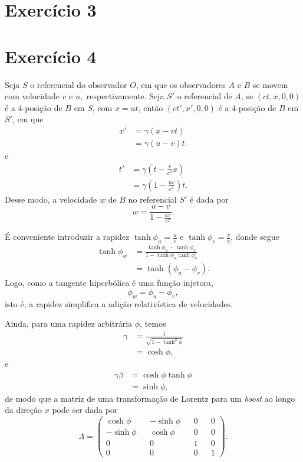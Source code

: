\documentclass[12pt,a4paper]{article}
\numberwithin{equation}{section}
\begin{document}
\section*{Exercício 3}
\section*{Exercício 4}
Seja \(S\) o referencial do observador \(O\), em que os observadores \(A\) e \(B\) se movem com velocidade \(v\) e \(u,\) respectivamente. Seja \(S'\) o referencial de \(A\), se \((ct, x, 0, 0)\) é a 4-posição de \(B\) em \(S\), com \(x = ut\), então \((ct', x', 0, 0)\) é a 4-posição de \(B\) em \(S'\), em que
\begin{align*}
    x' &= \gamma \left(x - vt\right)\\
       &= \gamma (u - v)t.
\end{align*}
e
\begin{align*}
    t' &= \gamma \left(t - \frac{v}{c^2}x\right)\\
       &= \gamma \left(1 - \frac{uv}{c^2}\right)t.
\end{align*}
Desse modo, a velocidade \(w\) de \(B\) no referencial \(S'\) é dada por
\begin{equation*}
    w = \frac{u - v}{1 - \frac{uv}{c^2}}.
\end{equation*}

É conveniente introduzir a rapidez \(\tanh \phi_u = \frac{u}{c}\) e \(\tanh \phi_v = \frac{v}{c}\), donde segue
\begin{align*}
    \tanh \phi_w &= \frac{\tanh \phi_u - \tanh \phi_v}{1 - \tanh \phi_u \tanh \phi_v}\\
                 &= \tanh\left(\phi_u - \phi_v\right).
\end{align*}
Logo, como a tangente hiperbólica é uma função injetora,
\begin{equation*}
    \phi_w = \phi_u - \phi_v,
\end{equation*}
isto é, a rapidez simplifica a adição relativística de velocidades.

Ainda, para uma rapidez arbitrária \(\phi\), temos
\begin{align*}
    \gamma &= \frac{1}{\sqrt{1 - \tanh^2\phi}}\\
           &= \cosh \phi,
\end{align*}
e
\begin{align*}
    \gamma \beta &= \cosh \phi \tanh \phi\\
                 &= \sinh \phi,
\end{align*}
de modo que a matriz de uma transformação de Lorentz para um \textit{boost} ao longo da direção \(x\) pode ser dada por
\begin{equation*}
    \Lambda = \begin{pmatrix}
        \cosh \phi && -\sinh \phi && 0 && 0\\
        -\sinh \phi && \cosh \phi && 0 && 0\\
        0 && 0 && 1 && 0 \\
        0 && 0 && 0 && 1
    \end{pmatrix}.
\end{equation*}
\end{document}
